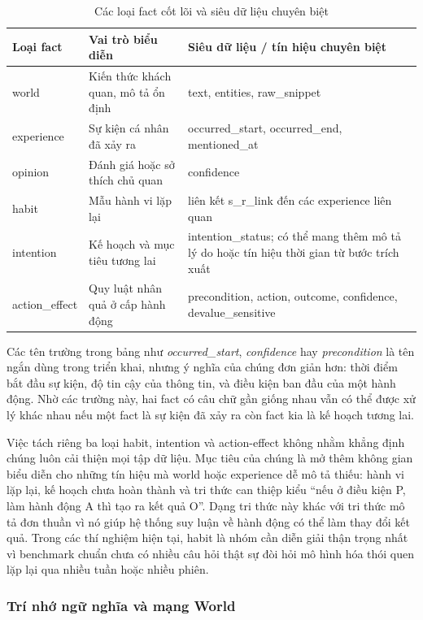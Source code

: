 \documentclass[../main.tex]{subfiles}
\begin{document}
\begin{table}[H]
\centering
\caption{Các loại fact cốt lõi và siêu dữ liệu chuyên biệt}
\label{tab:node_schemas}
\small
\begin{tabularx}{\linewidth}{@{}lYY@{}}
\toprule
\textbf{Loại fact} & \textbf{Vai trò biểu diễn} & \textbf{Siêu dữ liệu / tín hiệu chuyên biệt} \\
\midrule
world & Kiến thức khách quan, mô tả ổn định & text, entities, raw\_snippet \\
experience & Sự kiện cá nhân đã xảy ra & occurred\_start, occurred\_end, mentioned\_at \\
opinion & Đánh giá hoặc sở thích chủ quan & confidence \\
habit & Mẫu hành vi lặp lại & liên kết s\_r\_link đến các experience liên quan \\
intention & Kế hoạch và mục tiêu tương lai & intention\_status; có thể mang thêm mô tả lý do hoặc tín hiệu thời gian từ bước trích xuất \\
action\_effect & Quy luật nhân quả ở cấp hành động & precondition, action, outcome, confidence, devalue\_sensitive \\
\bottomrule
\end{tabularx}
\end{table}

Các tên trường trong bảng như \textit{occurred\_start}, \textit{confidence} hay \textit{precondition} là tên ngắn dùng trong triển khai, nhưng ý nghĩa của chúng đơn giản hơn: thời điểm bắt đầu sự kiện, độ tin cậy của thông tin, và điều kiện ban đầu của một hành động. Nhờ các trường này, hai fact có câu chữ gần giống nhau vẫn có thể được xử lý khác nhau nếu một fact là sự kiện đã xảy ra còn fact kia là kế hoạch tương lai.

Việc tách riêng ba loại habit, intention và action-effect không nhằm khẳng định chúng luôn cải thiện mọi tập dữ liệu. Mục tiêu của chúng là mở thêm không gian biểu diễn cho những tín hiệu mà world hoặc experience dễ mô tả thiếu: hành vi lặp lại, kế hoạch chưa hoàn thành và tri thức can thiệp kiểu ``nếu ở điều kiện P, làm hành động A thì tạo ra kết quả O''. Dạng tri thức này khác với tri thức mô tả đơn thuần vì nó giúp hệ thống suy luận về hành động có thể làm thay đổi kết quả. Trong các thí nghiệm hiện tại, habit là nhóm cần diễn giải thận trọng nhất vì benchmark chuẩn chưa có nhiều câu hỏi thật sự đòi hỏi mô hình hóa thói quen lặp lại qua nhiều tuần hoặc nhiều phiên.

\subsubsection{Trí nhớ ngữ nghĩa và mạng World}
\end{document}
